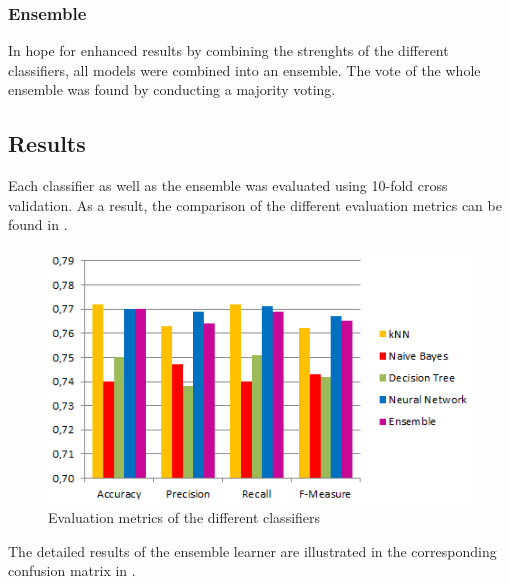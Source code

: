 \subsubsection*{Ensemble}
In hope for enhanced results by combining the strenghts of the
different classifiers, all models were combined into an ensemble. The
vote of the whole ensemble was found by conducting a majority voting.

\subsection{Results}
Each classifier as well as the ensemble was evaluated using 10-fold
cross validation.
As a result, the comparison of the different evaluation metrics can
be found in .

\begin{figure}[H]
	\centering
	\includegraphics[width=\columnwidth]{../../charts/results.png}
	\caption{Evaluation metrics of the different classifiers}
	\label{fig:result}
\end{figure}

\noindent The detailed results of the ensemble learner are illustrated in the corresponding
confusion matrix in .

\begin{table}[H]
	\centering
	\caption{Confusion matrix of the ensemble}
	\label{tab:mat-vote}
\end{table}

